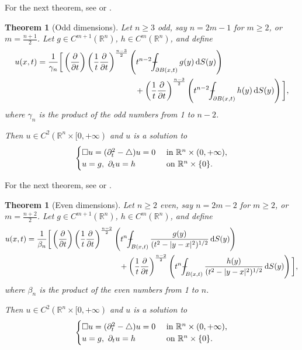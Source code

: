 \documentclass[a4paper,9pt]{amsart}
\newcommand{\R}{\mathbb{R}}	%
\newcommand{\did}{\,\mathrm{d}}	%
\newcommand{\de}{\partial}		%
\newcommand{\laplacian}{\triangle}
\def\Xint#1{\mathchoice
      {\XXint\displaystyle\textstyle{#1}}%
      {\XXint\textstyle\scriptstyle{#1}}%
      {\XXint\scriptstyle\scriptscriptstyle{#1}}%
      {\XXint\scriptscriptstyle\scriptscriptstyle{#1}}%
      \!\int}
\def\XXint#1#2#3{{\setbox0=\hbox{$#1{#2#3}{\int}$}
        \vcenter{\hbox{$#2#3$}}\kern-.5\wd0}}
\def\fint{\Xint-}
\theoremstyle{plain}
\newtheorem{theorem}[proposition]{Theorem}
\theoremstyle{definition}
\theoremstyle{remark}
\begin{document}
For the next theorem, see \cite[Th. 5.15, page 170]{MR1357411} or \cite[Th. 2.4.2, page 77]{MR2597943}.
\begin{theorem}[Odd dimensions]\label{thm67e1275d}
	Let $n\ge3$ odd, say $n= 2m-1$ for $m\ge2$, or $m=\frac{n+1}{2}$.
	Let $g\in C^{m+1}(\R^n)$, $h\in C^m(\R^n)$, and define
	\begin{equation}\label{eq67e16805}
	\begin{aligned}
		u(x,t) &= \frac1{\gamma_n} 
		\bigg[ 
		\left(\frac{\de}{\de t}\right) \left( \frac1t \frac{\de}{\de t} \right)^{\frac{n-3}{2}} \left( t^{n-2} \fint_{\de B(x,t)} g(y) \did S(y) \right) \\
		&\qquad\qquad\qquad\qquad\qquad\qquad
		+ \left(\frac1t \frac{\de}{\de t}\right)^{\frac{n-3}{2}} \left( t^{n-2} \fint_{\de B(x,t)} h(y) \did S(y) \right)
		\bigg] ,
	\end{aligned}
	\end{equation}
	where $\gamma_n$ is the product of the odd numbers from 1 to $n-2$.
	
	Then $u\in C^2(\R^n\times[0,+\infty)$ and $u$ is a solution to
	\begin{equation}
	\begin{cases}
		\waveop u = ( \de_t^2-\laplacian )u = 0 & \text{ in }\R^n\times(0,+\infty) , \\
		u = g,\ \de_t u = h & \text{ on }\R^n\times\{0\} .
	\end{cases}
	\end{equation}
\end{theorem}

For the next theorem, see \cite[Th. 5.17, page 171]{MR1357411} or \cite[Th. 2.4.3, page 80]{MR2597943}.
\begin{theorem}[Even dimensions]\label{thm67e12abf}
	Let $n\ge2$ even, say $n= 2m-2$ for $m\ge2$, or $m=\frac{n+2}{2}$.
	Let $g\in C^{m+1}(\R^n)$, $h\in C^m(\R^n)$, and define
	\begin{equation}\label{eq67e16844}
	\begin{aligned}
		u(x,t) &= \frac1{\beta_n} 
		\bigg[ 
		\left(\frac{\de}{\de t}\right) \left( \frac1t \frac{\de}{\de t} \right)^{\frac{n-2}{2}} \left( t^{n} \fint_{B(x,t)} \frac{g(y)}{(t^2-|y-x|^2)^{1/2}} \did S(y) \right) \\
		&\qquad\qquad\qquad\qquad\qquad\qquad
		+ \left(\frac1t \frac{\de}{\de t}\right)^{\frac{n-2}{2}} \left( t^{n} \fint_{B(x,t)} \frac{h(y)}{(t^2-|y-x|^2)^{1/2}}\did S(y) \right)
		\bigg] ,
	\end{aligned}
	\end{equation}
	where $\beta_n$ is the product of the even numbers from 1 to $n$.
	
	Then $u\in C^2(\R^n\times[0,+\infty)$ and $u$ is a solution to
	\begin{equation}
	\begin{cases}
		\waveop u = ( \de_t^2-\laplacian )u = 0 & \text{ in }\R^n\times(0,+\infty) , \\
		u = g,\ \de_t u = h & \text{ on }\R^n\times\{0\} .
	\end{cases}
	\end{equation}
\end{theorem}
\end{document}
